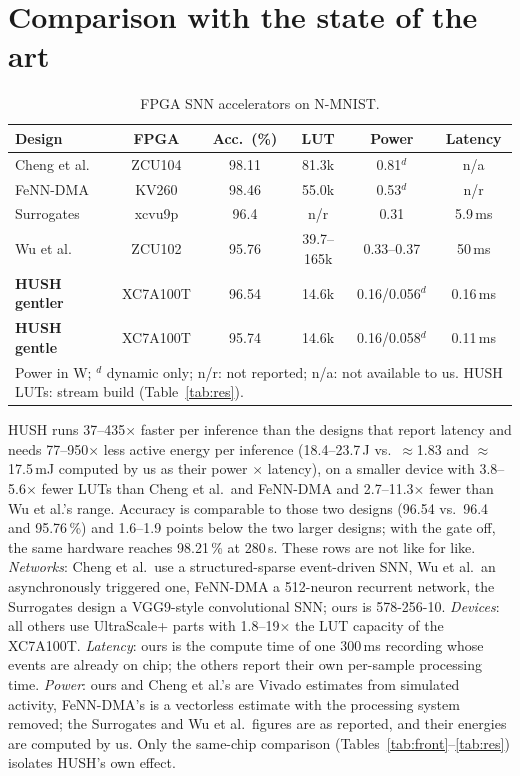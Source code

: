 \documentclass[conference]{IEEEtran}
\begin{document}
\section{Comparison with the state of the art}
\begin{table}[t]\centering\caption{FPGA SNN accelerators on N-MNIST.}\label{tab:sota}
\setlength{\tabcolsep}{2pt}\footnotesize
\begin{tabular}{lccccc}\toprule
Design & FPGA & Acc.\ (\%) & LUT & Power & Latency\\\midrule
Cheng et al.~\cite{cheng2025} & ZCU104 & 98.11 & 81.3k & 0.81$^d$ & n/a\\
FeNN-DMA~\cite{fenndma} & KV260 & 98.46 & 55.0k & 0.53$^d$ & n/r\\
Surrogates~\cite{surr2026} & xcvu9p & 96.4 & n/r & 0.31 & 5.9\,ms\\
Wu et al.~\cite{wu2023} & ZCU102 & 95.76 & 39.7--165k & 0.33--0.37 & 50\,ms\\
\textbf{HUSH gentler} & XC7A100T & 96.54 & 14.6k & 0.16/0.056$^d$ & 0.16\,ms\\
\textbf{HUSH gentle} & XC7A100T & 95.74 & 14.6k & 0.16/0.058$^d$ & 0.11\,ms\\\bottomrule
\multicolumn{6}{p{0.95\columnwidth}}{\footnotesize Power in W; $^d$ dynamic only; n/r: not reported; n/a: not available to us. HUSH LUTs: stream build (Table~\ref{tab:res}).}
\end{tabular}\end{table}
HUSH runs 37--435$\times$ faster per inference than the designs that report latency and needs 77--950$\times$ less
active energy per inference (18.4--23.7\,\textmu J vs.\ $\approx$1.83 and $\approx$17.5\,mJ computed by us as their power
$\times$ latency), on a smaller device with
3.8--5.6$\times$ fewer LUTs than Cheng et al.\ and FeNN-DMA and 2.7--11.3$\times$ fewer than Wu et al.'s range. Accuracy
is comparable to those two designs (96.54 vs.\ 96.4 and 95.76\,\%) and 1.6--1.9 points below the two larger designs;
with the gate off, the same hardware reaches 98.21\,\% at 280\,\textmu s. These rows are not like for like.
\emph{Networks}: Cheng et al.\ use a structured-sparse event-driven SNN, Wu et al.\ an asynchronously triggered one, FeNN-DMA a 512-neuron recurrent
network, the Surrogates design a VGG9-style convolutional SNN; ours is 578-256-10. \emph{Devices}: all others use
UltraScale+ parts with 1.8--19$\times$ the LUT capacity of the XC7A100T. \emph{Latency}: ours is the compute time of one 300\,ms recording
whose events are already on chip; the others report their own per-sample processing time. \emph{Power}: ours and
Cheng et al.'s are Vivado estimates from simulated activity, FeNN-DMA's is a vectorless estimate with the processing
system removed; the Surrogates and Wu et al.\ figures are as reported, and their energies are computed by us. Only the same-chip comparison
(Tables~\ref{tab:front}--\ref{tab:res}) isolates HUSH's own effect.
\end{document}
